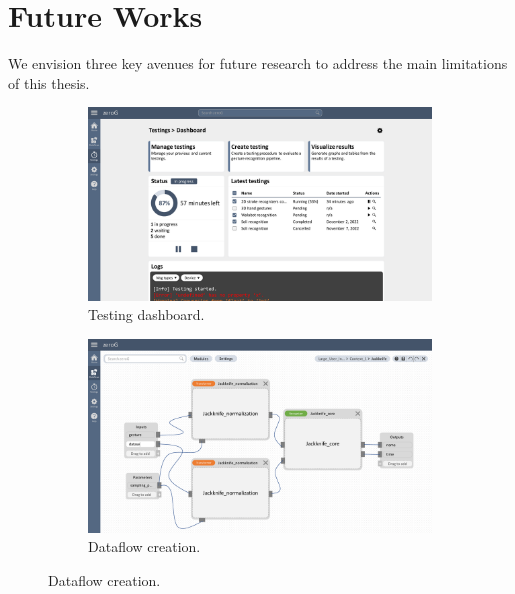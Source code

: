 \section{Future Works}
\label{sec:conclusion:limitations-and-future-works}
We envision three key avenues for future research to address the main limitations of this thesis.

\begin{figure}[htp]
  \centering
  \begin{subfigure}{\textwidth}
      \centering
      \includegraphics[width=.79\linewidth]{Figures/Conclusion/zeroG-1.pdf}  
      \vspace{-4pt}
      \captionsetup{width=.9\linewidth}
      \caption{Testing dashboard.}
      \label{fig:zerog:ui:1}
  \end{subfigure}

  \begin{subfigure}{\textwidth}
      \centering
      \includegraphics[width=.79\linewidth]{Figures/Conclusion/zeroG-2.pdf}  
      \vspace{-4pt}
      \captionsetup{width=.9\linewidth}
      \caption{Dataflow creation.}
      \label{fig:zerog:ui:2}
  \end{subfigure}
  

\end{figure}
